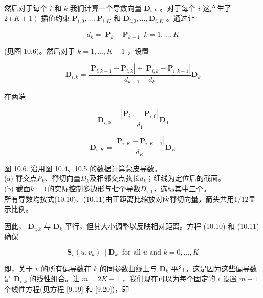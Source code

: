 \documentclass[../main.tex]{subfiles}
\begin{document}
然后对于每个 \(i\) 和 \(k\) 我们计算一个导数向量 \({\mathbf{D}}_{i,k}\) 。对于每个 \(i\) 这产生了 \(2\left( {K + 1}\right)\) 插值约束 \({\mathbf{P}}_{i,0},\ldots ,{\mathbf{P}}_{i,K}\) 和 \({\mathbf{D}}_{i,0},\ldots ,{\mathbf{D}}_{i,K}\) 。通过让

\[
{d}_{k} = \left| {{\mathbf{P}}_{k} - {\mathbf{P}}_{k - 1}}\right| \;k = 1,\ldots ,K
\]

(见图 10.6)。然后对于 \(k = 1,\ldots ,K - 1\) ，设置

\[
{\mathbf{D}}_{i,k} = \frac{\left| {{\mathbf{P}}_{i,k + 1} - {\mathbf{P}}_{i,k}}\right|  + \left| {{\mathbf{P}}_{i,k} - {\mathbf{P}}_{i,k - 1}}\right| }{{d}_{k + 1} + {d}_{k}}{\mathbf{D}}_{k} \tag{10.10}
\]

在两端

\[
{\mathbf{D}}_{i,0} = \frac{\left| {\mathbf{P}}_{i,1} - {\mathbf{P}}_{i,0}\right| }{{d}_{1}}{\mathbf{D}}_{0}
\]

\[
{\mathbf{D}}_{i,K} = \frac{\left| {\mathbf{P}}_{i,K} - {\mathbf{P}}_{i,K - 1}\right| }{{d}_{K}}{\mathbf{D}}_{K} \tag{10.11}
\]

\begin{center}
\begin{minipage}{29cm}
\vspace*{.6\baselineskip}
\centering
{}
\par\smallskip
图 10.6. 沿用图 10.4、10.5 的数据计算蒙皮导数。\\
(a) 脊交点$P_k$、脊切向量$D_k$及相邻交点弦长$d_k$；细线为定位后的截面。\\
(b) 截面$k=1$的实际控制多边形与七个导数$D_{i,1}$，选标其中三个。\\
所有导数均按式(10.10)、(10.11)由正距离比缩放对应脊切向量，箭头共用$1/12$显示比例。
\end{minipage}
\end{center}

因此， \({\mathbf{D}}_{i,k}\) 与 \({\mathbf{D}}_{k}\) 平行，但其大小调整以反映相对距离。方程 (10.10) 和 (10.11) 确保

\[
{\mathbf{S}}_{v}\left( {u,{\bar{v}}_{k}}\right) \parallel {\mathbf{D}}_{k}\;\text{ for all }u\text{ and }k = 0,\ldots ,K \tag{10.12}
\]

即，关于 \(v\) 的所有偏导数在 \(k\) 的同参数曲线上与 \({\mathbf{D}}_{k}\) 平行。这是因为这些偏导数是 \({\mathbf{D}}_{i,k}\) 的线性组合。让 \(m = {2K} + 1\) ，我们现在可以为每个固定的 \(i\) 设置 \(m + 1\) 个线性方程(见方程 [9.19] 和 [9.20])，即
\end{document}
